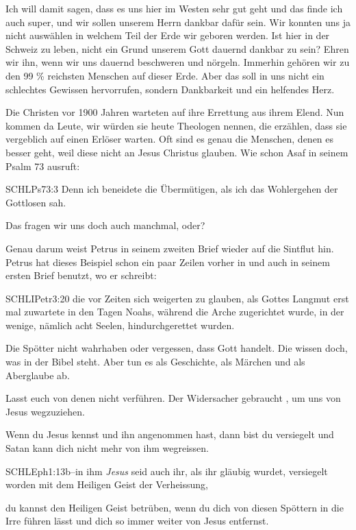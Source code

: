 \documentclass[fontsize=16pt]{mybib}
\begin{document}
Ich will damit sagen, dass es uns hier im Westen sehr gut geht und das finde ich auch super, und wir sollen unserem Herrn dankbar dafür sein. Wir konnten uns ja nicht auswählen in welchem Teil der Erde wir geboren werden. Ist hier in der Schweiz zu leben, nicht ein Grund unserem Gott dauernd dankbar zu sein? Ehren wir ihn, wenn wir uns dauernd beschweren und nörgeln. Immerhin gehören wir zu den 99 \% reichsten Menschen auf dieser Erde. Aber das soll in uns nicht ein schlechtes Gewissen hervorrufen, sondern Dankbarkeit und ein helfendes Herz.

Die Christen vor 1900 Jahren warteten auf ihre Errettung aus ihrem Elend. Nun kommen da Leute, wir würden sie heute Theologen nennen, die erzählen, dass sie vergeblich auf einen Erlöser warten. Oft sind es genau die Menschen, denen es besser geht, weil diese nicht an Jesus Christus glauben. Wie schon Asaf in seinem Psalm 73 ausruft:
\begin{bibelbox}{SCHL}{Ps}{73:3}
  Denn ich beneidete die Übermütigen, als ich das Wohlergehen der Gottlosen sah.
\end{bibelbox}
Das fragen wir uns doch auch manchmal, oder?

Genau darum weist Petrus in seinem zweiten Brief wieder auf die Sintflut hin. Petrus hat dieses Beispiel schon ein paar Zeilen vorher in  und auch in seinem ersten Brief  benutzt, wo er schreibt:
\begin{bibelbox}{SCHL}{IPetr}{3:20}
die vor Zeiten sich weigerten zu glauben, als Gottes Langmut erst mal zuwartete in den Tagen Noahs, während die Arche zugerichtet wurde, in der wenige, nämlich acht Seelen, hindurchgerettet wurden.
\end{bibelbox}
Die Spötter  nicht wahrhaben oder  vergessen, dass Gott handelt. Die  wissen doch, was in der Bibel steht. Aber tun es als Geschichte, als Märchen und als Aberglaube ab.

Lasst euch von denen nicht verführen. Der Widersacher gebraucht , um uns von Jesus wegzuziehen.\\

Wenn du Jesus kennst und ihn angenommen hast, dann bist du versiegelt und Satan kann dich nicht mehr von ihm wegreissen. 
\begin{bibelbox}{SCHL}{Eph}{1:13b}--in ihm \textit{Jesus} seid auch ihr, als ihr gläubig wurdet, versiegelt worden mit dem Heiligen Geist der Verheissung,
\end{bibelbox}
 du kannst den Heiligen Geist betrüben, wenn du dich von diesen Spöttern in die Irre führen lässt und dich so immer weiter von Jesus entfernst.
\end{document}
